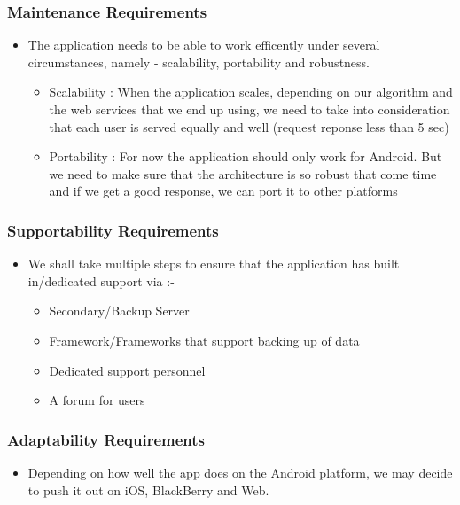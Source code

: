 \documentclass[]{article}
\begin{document}
\subsubsection{Maintenance Requirements}
\label{ssub:maintenance_requirements}
\begin{itemize}
	\item The application needs to be able to work efficently under several circumstances, namely - scalability, portability and robustness.
		\begin{itemize}
		\item Scalability : When the application scales, depending on our algorithm and the web services that we end up using, we need to take into consideration that each user is served equally and well (request reponse less than 5 sec)
	    \item Portability : For now the application should only work for Android. But we need to make sure that the architecture is so robust that come time and if we get a good response, we can port it to other platforms
        \end{itemize}	    
\end{itemize}

\subsubsection{Supportability Requirements}
\label{ssub:supportability_requirements}
\begin{itemize}
	\item We shall take multiple steps to ensure that the application has built in/dedicated support via :-
	    \begin{itemize}
	    \item Secondary/Backup Server
	    \item Framework/Frameworks that support backing up of data
	    \item Dedicated support personnel
	    \item A forum for users
	    \end{itemize}
\end{itemize}

\subsubsection{Adaptability Requirements}
\label{ssub:adaptability_requirements}
\begin{itemize}
	\item Depending on how well the app does on the Android platform, we may decide to push it out on iOS, BlackBerry and Web.
\end{itemize}
\end{document}
